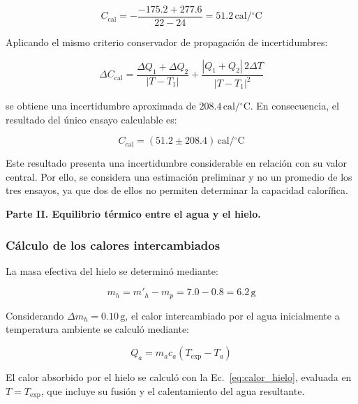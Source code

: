 \begin{equation*}
    C_{\mathrm{cal}}=
    -\frac{-175.2+277.6}{22-24}
    =51.2\,\mathrm{cal}/{}^{\circ}\mathrm{C}
\end{equation*}

Aplicando el mismo criterio conservador de propagación de incertidumbres:

\begin{equation}
    \Delta C_{\mathrm{cal}}=
    \frac{\Delta Q_1+\Delta Q_2}{|T-T_1|}
    +
    \frac{|Q_1+Q_2|\,2\Delta T}{|T-T_1|^2}
    \label{eq:incertidumbre_capacidad}
\end{equation}

se obtiene una incertidumbre aproximada de $208.4\,\mathrm{cal}/{}^{\circ}\mathrm{C}$. En consecuencia, el resultado del único ensayo calculable es:

\begin{equation*}
    \boxed{
    C_{\mathrm{cal}}=(51.2\pm208.4)\,
    \mathrm{cal}/{}^{\circ}\mathrm{C}
    }
\end{equation*}

Este resultado presenta una incertidumbre considerable en relación con su valor central. Por ello, se considera una estimación preliminar y no un promedio de los tres ensayos, ya que dos de ellos no permiten determinar la capacidad calorífica.

\textbf{Parte II. Equilibrio térmico entre el agua y el hielo.}

\subsubsection{Cálculo de los calores intercambiados}

La masa efectiva del hielo se determinó mediante:

\begin{equation*}
    m_h=m'_h-m_p=7.0-0.8=6.2\,\mathrm{g}
\end{equation*}

Considerando $\Delta m_h=0.10\,\mathrm{g}$, el calor intercambiado por el agua inicialmente a temperatura ambiente se calculó mediante:

\begin{equation}
    Q_a=m_ac_a(T_{\mathrm{exp}}-T_a)
    \label{eq:calor_agua_ambiente}
\end{equation}

El calor absorbido por el hielo se calculó con la Ec.~\eqref{eq:calor_hielo}, evaluada en $T=T_{\mathrm{exp}}$, que incluye su fusión y el calentamiento del agua resultante.

